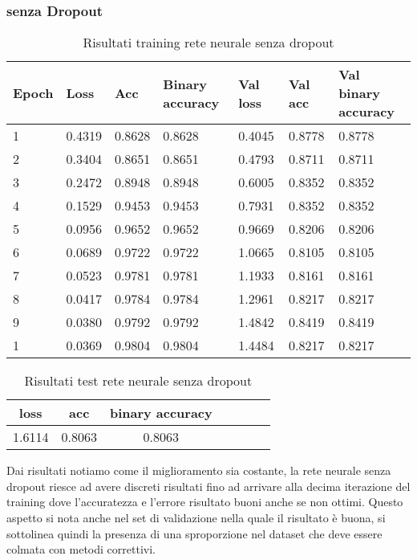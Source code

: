 \subsubsection{senza Dropout}
\renewcommand{\arraystretch}{1.4}
\begin{table}[H]
	\begin{center}
		\begin{tabular}{|p{1.2cm}|p{1.2cm}|p{1.2cm}|p{2cm}|p{1.2cm}|p{1.2cm}|p{2.5cm}|}
			\hline
			\textbf{Epoch} & \textbf{Loss}    & \textbf{Acc} & \textbf{Binary accuracy} & \textbf{Val loss} & \textbf{Val acc} & \textbf{Val binary accuracy}\\ \hline
			1 & 0.4319 & 0.8628 & 0.8628 & 0.4045 & 0.8778 & 0.8778 \\ \hline
			2 & 0.3404 & 0.8651 & 0.8651 & 0.4793 & 0.8711 & 0.8711 \\ \hline
			3 & 0.2472 & 0.8948 & 0.8948 & 0.6005 & 0.8352 & 0.8352 \\ \hline
			4 & 0.1529 & 0.9453 & 0.9453 & 0.7931 & 0.8352 & 0.8352 \\ \hline
			5 & 0.0956 & 0.9652 & 0.9652 & 0.9669 & 0.8206 & 0.8206 \\ \hline
			6 & 0.0689 & 0.9722 & 0.9722 & 1.0665 & 0.8105 & 0.8105 \\ \hline
			7 & 0.0523 & 0.9781 & 0.9781 & 1.1933 & 0.8161 & 0.8161 \\ \hline
			8 & 0.0417 & 0.9784 & 0.9784 & 1.2961 & 0.8217 & 0.8217 \\ \hline
			9 & 0.0380 & 0.9792 & 0.9792 & 1.4842 & 0.8419 & 0.8419 \\ \hline
			1 & 0.0369 & 0.9804 & 0.9804 & 1.4484 & 0.8217 & 0.8217 \\ \hline
		\end{tabular}
		\caption{Risultati training rete neurale senza dropout\label{}}
	\end{center}
\end{table}
\renewcommand{\arraystretch}{1}
\renewcommand{\arraystretch}{1.4}
\begin{table}[H]
	\begin{center}
		\begin{tabular}{|c|c|c|c|c|c|c|}
			\hline
			\textbf{loss} & \textbf{acc} & \textbf{binary accuracy} \\ \hline
			1.6114  & 0.8063 & 0.8063 \\ \hline
		\end{tabular}
		\caption{Risultati test rete neurale senza dropout\label{}}
	\end{center}
\end{table}
\renewcommand{\arraystretch}{1}
Dai risultati notiamo come il miglioramento sia costante, la rete neurale senza dropout riesce ad avere discreti risultati fino ad arrivare alla decima iterazione del training dove l'accuratezza e l'errore risultato buoni anche se non ottimi.
Questo aspetto si nota anche nel set di validazione nella quale il risultato è buona, si sottolinea quindi la presenza di una sproporzione nel dataset che deve essere colmata con metodi correttivi.
